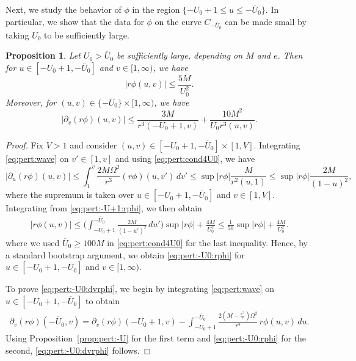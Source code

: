 \documentclass[12 pt, reqno]{amsart}
\newtheorem{proposition}[theorem]{Proposition}
\theoremstyle{definition}
\theoremstyle{remark}
\numberwithin{equation}{section}
\newcommand{\abs}[1]{\vert#1\vert}
\newcommand{\set}[1]{\{#1\}}
\newcommand{\ud}{d}
\newcommand{\rd}{\partial}
\newcommand{\bb}{\Big}
\newcommand{\0}{\emptyset}
\newcommand{\Omg}{\Omega}
\newcommand{\Ufree}{U_{0}}
\newcommand{\Ufixed}{\overline{U}_{0}}
\begin{document}
Next, we study the behavior of $\phi$ in the region $\set{-\Ufree +1 \leq u \leq -\Ufixed}$. In particular, we show that the data for $\phi$ on the curve $C_{-\Ufixed}$ can be made small by taking $\Ufree$ to be sufficiently large.
\begin{proposition} \label{prop:pert:-U0}
Let $\Ufree > \Ufixed$ be sufficiently large, depending on $M$ and $e$. Then for $u \in [-\Ufree+1, - \Ufixed]$ and $v \in [1, \infty)$, we have 
\begin{equation} \label{eq:pert:-U0:rphi}
	\abs{r \phi(u,v)} \leq  \frac{5 M}{\Ufree^{2}}. 
\end{equation}
Moreover, for $(u, v) \in \set{- \Ufixed} \times [1, \infty)$, we have
\begin{equation} \label{eq:pert:-U0:dvrphi}
	\abs{\rd_{v} (r \phi)(u, v)} \leq \frac{3M}{r^{3}(-\Ufree+1, v)} + \frac{10 M^{2}}{\Ufree r^{3}(u, v)}.
\end{equation}
\end{proposition}
\begin{proof} 
Fix $V > 1$ and consider $(u, v) \in [-\Ufree+1, -\Ufixed] \times [1, V]$. Integrating \eqref{eq:pert:wave} on $v' \in [1, v]$ and using \eqref{eq:pert:cond4U0}, we have
\begin{equation*}
	\abs{\rd_{u} (r \phi)(u, v)} \leq \int_{1}^{v} \frac{2M\Omg^2}{r^{3}} (r \phi)(u, v') \, \ud v'
	\leq \sup \abs{r \phi} \frac{M}{r^{2}(u, 1)}
	\leq  \sup \abs{r \phi} \frac{2 M}{(1-u)^{2}},
\end{equation*}
where the supremum is taken over $u \in [-\Ufree+1, -\Ufixed]$ and $v \in [1, V]$. Integrating from \eqref{eq:pert:-U+1:rphi}, we then obtain
\begin{align*}
	\abs{r \phi(u,v)} 
	\leq  \bb( \int_{-\Ufree+1}^{-\Ufixed} \frac{2M}{(1-u')^{2}} \, \ud u' \bb) \sup \abs{r \phi} + \frac{4M}{\Ufree^{2}} 
	\leq \frac{1}{50} \sup\abs{r \phi} + \frac{4M}{\Ufree^{2}}.
\end{align*}
where we used $\Ufixed \geq 100 M$ in \eqref{eq:pert:cond4U0} for the last inequality. Hence, by a standard bootstrap argument, we obtain \eqref{eq:pert:-U0:rphi} for $u \in [-\Ufree+1, -\Ufixed]$ and $v \in [1, \infty)$.

To prove \eqref{eq:pert:-U0:dvrphi}, we begin by integrating \eqref{eq:pert:wave} on $u \in [-\Ufree+1, -\Ufixed]$ to obtain
\begin{align*}
	\rd_{v}(r \phi)(-\Ufixed, v) = \rd_{v}(r \phi)(-\Ufree+1, v) - \int_{-\Ufree+1}^{-\Ufixed} \frac{2(M-\frac{e^{2}}{r}) \Omg^2}{r^{3}} \, r \phi(u, v) \, \ud u.
\end{align*}
Using Proposition~\ref{prop:pert:-U} for the first term and \eqref{eq:pert:-U0:rphi} for the second, \eqref{eq:pert:-U0:dvrphi} follows. \qedhere
\end{proof}
\end{document}
